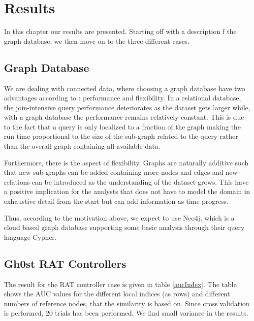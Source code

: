 \chapter{Results}
In this chapter our results are presented. Starting off with a description f the graph database, we then move on to the three different cases. 

\section{Graph Database}
We are dealing with connected data, where choosing a graph database have two advantages according to \citet{robinson2013}: performance and flexibility. In a relational database, the join-intensive query performance deteriorates as the dataset gets larger while, with a graph database the performance remains relatively constant. This is due to the fact that a query is only localized to a fraction of the graph making the run time proportional to the size of the sub-graph related to the query rather than the overall graph containing all available data.

Furthermore, there is the aspect of flexibility. Graphs are naturally additive \cite{robinson2013} such that new sub-graphs can be added containing more nodes and edges and new relations can be introduced as the understanding of the dataset grows. This have a positive implication for the analysts that does not have to model the domain in exhaustive detail from the start but can add information as time progress. 

Thus, according to the motivation above, we expect to use Neo4j, which is a cloud based graph database supporting some basic analysis through their query language Cypher.

\section{Gh0st RAT Controllers}

The result for the RAT controller case is given in table \ref{aucIndex}. The table shows the AUC values for the different local indices (as rows) and different numbers of reference nodes, that the similarity is based on. Since cross validation is performed, 20 trials has been performed. We find small variance in the results.

